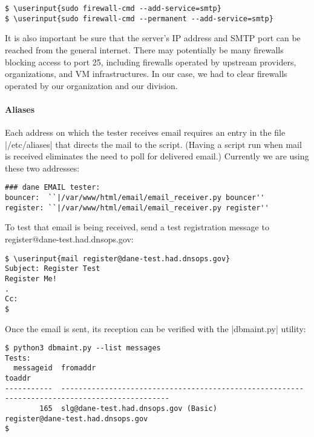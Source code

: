 \documentclass[preprint,3p,11pt]{elsarticle}
\newcommand\userinput[1]{\textbf{#1}}
\begin{document}
\begin{Verbatim}[commandchars=\\\{\}]
$ \userinput{sudo firewall-cmd --add-service=smtp}
$ \userinput{sudo firewall-cmd --permanent --add-service=smtp}
\end{Verbatim}

It is also important be sure that the server's IP address and SMTP
port can be reached from the general internet. There may potentially
be many firewalls blocking access to port 25, including firewalls
operated by upstream providers, organizations, and VM
infrastructures. In our case, we had to clear firewalls operated by
our organization and our division.

\paragraph{Aliases}

Each address on which the tester receives email requires an entry in
the file |/etc/aliases| that directs the mail to the script. (Having a
script run when mail is received eliminates the need to poll for
delivered email.)  Currently we are using these two addresses:

\begin{Verbatim}[commandchars=\\\{\}]
### dane EMAIL tester:
bouncer:  ``|/var/www/html/email/email_receiver.py bouncer''
register: ``|/var/www/html/email/email_receiver.py register''
\end{Verbatim}

To test that email is being received, send a test registration message
to register@dane-test.had.dnsops.gov:

\begin{Verbatim}[commandchars=\\\{\}]
$ \userinput{mail register@dane-test.had.dnsops.gov}
Subject: Register Test
Register Me!
.
Cc:
$
\end{Verbatim}

Once the email is sent, its reception can be verified with the
|dbmaint.py| utility:

\begin{Verbatim}[commandchars=\\\{\}]
$ python3 dbmaint.py --list messages
Tests:
  messageid  fromaddr                                                  toaddr                                    
-----------  --------------------------------------------------------  --------------------------------------
        165  slg@dane-test.had.dnsops.gov (Basic)                      register@dane-test.had.dnsops.gov         
$
\end{Verbatim}
\end{document}
